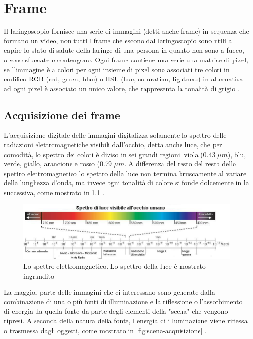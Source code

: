 \chapter{Frame}\label{frame}

Il laringoscopio fornisce una serie di immagini (detti anche frame) in sequenza che formano un video, non tutti i frame che escono dal laringoscopio sono utili a capire lo stato di salute della laringe di una persona in quanto non sono a fuoco, o sono sfuocate o contengono. Ogni frame contiene una serie una matrice di pixel, se l'immagine è a colori per ogni insieme di pixel sono associati tre colori in codifica RGB (red, green, blue) o HSL (hue, saturation, lightness) in alternativa ad ogni pixel è associato un unico valore, che rappresenta la tonalità di grigio \cite{gonzalez_dip}.

\section{Acquisizione dei frame}\label{acquisizione-dei-frame}

L'acquisizione digitale delle immagini digitalizza solamente lo spettro delle radiazioni elettromagnetiche visibili dall'occhio, detta anche luce, che per comodità, lo spettro dei colori è diviso in sei grandi regioni: viola (0.43 \(\mu m\)), blu, verde, giallo, arancione e rosso (0.79 \(\mu m\). A differenza del resto del resto dello spettro elettromagnetico lo spettro della luce non termina bruscamente al variare della lunghezza d'onda, ma invece ogni tonalità di colore si fonde dolcemente in
la successiva, come mostrato in \cref{fig:spettro-onde} \cite{gonzalez_dip}.

\begin{figure}[ht]
    \centering
    \includegraphics[width=1\textwidth]{frame/Spettro-onde.jpg}
    \caption{Lo spettro elettromagnetico. Lo spettro della luce è mostrato ingrandito}
    \label{fig:spettro-onde}
\end{figure}

La maggior parte delle immagini che ci interessano sono generate dalla combinazione di una o più fonti di illuminazione e la riflessione o l'assorbimento di energia da quella fonte da parte degli elementi della "scena" che vengono ripresi. A seconda della natura della fonte, l'energia di illuminazione viene riflessa o trasmessa dagli oggetti, come mostrato in \cref{fig:scena-acquisizione} \cite{gonzalez_dip}.

